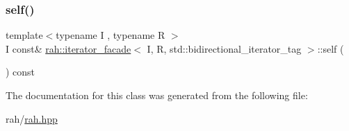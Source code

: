 \mbox{\label{structrah_1_1iterator__facade_3_01_i_00_01_r_00_01std_1_1bidirectional__iterator__tag_01_4_ae2156f4940ef87b6852ff7abe52002c9}} 
\subsubsection{\texorpdfstring{self()}{self()}\hspace{0.1cm}{\footnotesize\ttfamily [2/2]}}
{\footnotesize\ttfamily template$<$typename I , typename R $>$ \\
I const\& \mbox{\hyperlink{structrah_1_1iterator__facade}{rah\+::iterator\+\_\+facade}}$<$ I, R, std\+::bidirectional\+\_\+iterator\+\_\+tag $>$\+::self (\begin{DoxyParamCaption}{ }\end{DoxyParamCaption}) const\hspace{0.3cm}{\ttfamily [inline]}}



The documentation for this class was generated from the following file\+:\begin{DoxyCompactItemize}
\item 
rah/\mbox{\hyperlink{rah_8hpp}{rah.\+hpp}}\end{DoxyCompactItemize}
